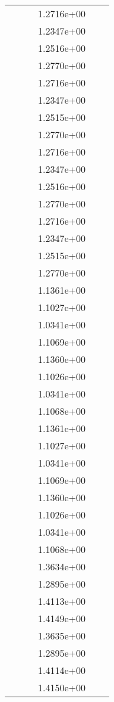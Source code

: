 \begin{xltabular}{\textwidth}{r|rS[table-format=1.3e+2]S[table-format=1.4e+2]S[table-format=1.4e+2]S[table-format=-1.5]}
&  &  & 1.2716e+00 & & \\
&  &  & 1.2347e+00 & & \\
&  &  & 1.2516e+00 & & \\
&  &  & 1.2770e+00 & & \\
&  &  & 1.2716e+00 & & \\
&  &  & 1.2347e+00 & & \\
&  &  & 1.2515e+00 & & \\
&  &  & 1.2770e+00 & & \\
&  &  & 1.2716e+00 & & \\
&  &  & 1.2347e+00 & & \\
&  &  & 1.2516e+00 & & \\
&  &  & 1.2770e+00 & & \\
&  &  & 1.2716e+00 & & \\
&  &  & 1.2347e+00 & & \\
&  &  & 1.2515e+00 & & \\
&  &  & 1.2770e+00 & & \\
&  &  & 1.1361e+00 & & \\
&  &  & 1.1027e+00 & & \\
&  &  & 1.0341e+00 & & \\
&  &  & 1.1069e+00 & & \\
&  &  & 1.1360e+00 & & \\
&  &  & 1.1026e+00 & & \\
&  &  & 1.0341e+00 & & \\
&  &  & 1.1068e+00 & & \\
&  &  & 1.1361e+00 & & \\
&  &  & 1.1027e+00 & & \\
&  &  & 1.0341e+00 & & \\
&  &  & 1.1069e+00 & & \\
&  &  & 1.1360e+00 & & \\
&  &  & 1.1026e+00 & & \\
&  &  & 1.0341e+00 & & \\
&  &  & 1.1068e+00 & & \\
&  &  & 1.3634e+00 & & \\
&  &  & 1.2895e+00 & & \\
&  &  & 1.4113e+00 & & \\
&  &  & 1.4149e+00 & & \\
&  &  & 1.3635e+00 & & \\
&  &  & 1.2895e+00 & & \\
&  &  & 1.4114e+00 & & \\
&  &  & 1.4150e+00 & & \\

\end{xltabular}

